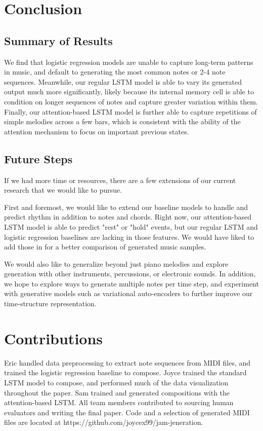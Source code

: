\documentclass[twoside,twocolumn]{article}
\begin{document}
\section{Conclusion}

\subsection{Summary of Results}

We find that logistic regression models are unable to capture long-term patterns in music, and default to generating the most common notes or 2-4 note sequences. Meanwhile, our regular LSTM model is able to vary its generated output much more significantly, likely because its internal memory cell is able to condition on longer sequences of notes and capture greater variation within them. Finally, our attention-based LSTM model is further able to capture repetitions of simple melodies across a few bars, which is consistent with the ability of the attention mechanism to focus on important previous states.


\subsection{Future Steps}
If we had more time or resources, there are a few extensions of our current research that we would like to pursue.

First and foremost, we would like to extend our baseline models to handle and predict rhythm in addition to notes and chords. Right now, our attention-based LSTM model is able to predict "rest" or "hold" events, but our regular LSTM and logistic regression baselines are lacking in those features. We would have liked to add those in for a better comparison of generated music samples.

We would also like to generalize beyond just piano melodies and explore generation with
other instruments, percussions, or electronic sounds. In addition, we hope to
explore ways to generate multiple notes per time step, and experiment with generative models such as variational auto-encoders to further improve our time-structure
representation.


\section{Contributions}

Eric handled data preprocessing to extract note sequences from MIDI files, and trained the logistic regression baseline to compose. Joyce trained the standard LSTM model to compose, and performed much of the data visualization throughout the paper. Sam trained and generated compositions with the attention-based LSTM. All team members contributed to sourcing human evaluators and writing the final paper. Code and a selection of generated MIDI files are located at https://github.com/joycex99/jam-jeneration.
\end{document}
